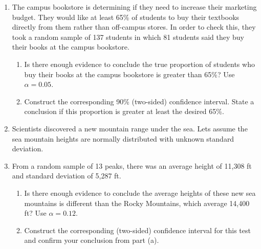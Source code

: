 \documentclass{article}
\begin{document}
\begin{enumerate}
    \item The campus bookstore is determining if they need to increase their marketing budget. They would like at least 65\% of students to buy their textbooks directly from them rather than off-campus stores. In order to check this, they took a random sample of 137 students in which 81 students said they buy their books at the campus bookstore.%
    \begin{enumerate}
        \item Is there enough evidence to conclude the true proportion of students who buy their books at the campus bookstore is greater than 65\%? Use $\alpha = 0.05$.\vspace{200pt}
        \item Construct the corresponding 90\% (two-sided) confidence interval. State a conclusion if this proportion is greater at least the desired 65\%.\vspace{100pt}
    \end{enumerate}
   

    \item Scientists discovered a new mountain range under the sea. Lets assume the sea mountain heights are normally distributed with unknown standard deviation.
    \item[] From a random sample of 13 peaks, there was an average height of 11,308 ft and standard deviation of 5,287 ft.%
        \begin{enumerate}
        \item Is there enough evidence to conclude the average heights of these new sea mountains is different than the Rocky Mountains, which average 14,400 ft? Use $\alpha = 0.12$.\vspace{250pt}
        \item Construct the corresponding (two-sided) confidence interval for this test and confirm your conclusion from part (a).\vspace{100pt}
    \end{enumerate}\newpage
    

\end{enumerate}
\end{document}
